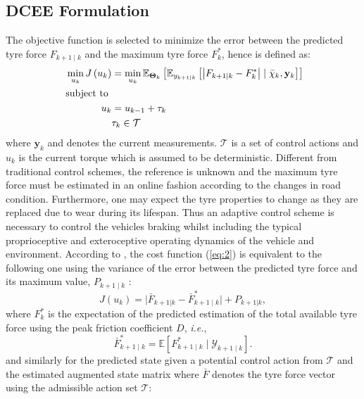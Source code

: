 \documentclass[onecolumn,journal,draftclsnofoot]{IEEEtran}
\begin{document}
\subsection{DCEE Formulation}
The objective function is selected to minimize the error between the predicted tyre force \(F_{k+1 \mid k}\) and the maximum tyre force \(F_k^*\), hence is defined as:
\begin{subequations}\label{eq:2}
\begin{align}
\min _{{u}_{k}} J\left({u}_{k}\right)&=\min_{{u}_{k}} \mathbb{E}_{\mathbf{\Theta}_k}\left[\mathbb{E}_{y_{k+1|k}}\left[\big|F_{k+1 \mid k}-F_k^*\big| \mid \bar{\mathbf{\chi}}_k,\mathbf{y}_k\right]\right]\label{eq:2A}\\
\text { subject to } \notag \\
{u}_{k}&= {u}_{k-1} + {\tau}_{k} \label{eq:2B}\\
&{\tau}_{k} \in \mathcal{T} \label{eq:2c}
\end{align}
\end{subequations}
where \( \mathbf{y}_k\) and  denotes the  current measurements. \(\mathcal{T}\) is a set of control actions and \(u_k\) is the current torque which is assumed to be deterministic. 
Different from traditional control schemes, the reference is unknown and the maximum tyre force must be estimated in an online fashion according to the changes in road condition. 
Furthermore, one may expect the tyre properties to change as they are replaced due to wear during its lifespan. 
Thus an adaptive control scheme is necessary to control the vehicles braking whilst including the typical proprioceptive and exteroceptive operating dynamics of the vehicle and environment.
According to \cite{Chen2021}, the cost function (\ref{eq:2}) is equivalent to the following one using the variance of the error between the predicted tyre force and its maximum value, \({P}_{k+1 \mid k}\) :
\begin{equation}\label{eqn:dcee}
    J({u}_k) = \big| \bar{{F}}_{k+1|k} - \bar{F}_{k+1 \mid k}^*\big| + {P}_{k+1|k},
\end{equation}
where \({F}^*_{k}\) is the expectation of the predicted estimation of the total available tyre force using the peak friction coefficient \(D\), \emph{i.e.},
\begin{equation}\label{alg:expFp}
    \bar{F}^*_{k+1\mid k} = \mathbb{E}\left[F_{k+1\mid k}^{*} \mid \mathcal{Y}_{k+1 \mid k} \right].
\end{equation}
and similarly for the predicted state given a potential control action from \(\mathcal{T}\) and the estimated augmented state matrix where \(\bar{{F}}\) denotes the tyre force vector using the admissible action set \(\mathcal{T}\):
\end{document}
